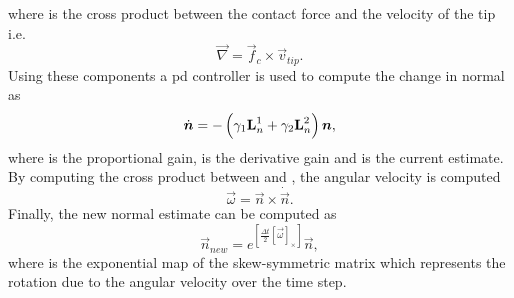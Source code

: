 where  is the cross product between the contact force  and the velocity of the tip  i.e.
%
\begin{equation} \label{eq:def-nabla-rls}
	\vec{\nabla} = \vec{f}_c \times \vec{v}_{tip}.
\end{equation}
Using these components a \gls{pd} controller is used to compute the change in normal  as 
%
\begin{equation} \label{eq:def-n-dot}
	\dot{\bm{n}} = -\left( \gamma_1 \bm{\mathrm{L}}_n^1 + \gamma_2 \bm{\mathrm{L}}_n^2 \right)\bm{n},
\end{equation}
where \mvar{\gamma_1\inR{}} is the proportional gain, \mvar{\gamma_2\inR{}} is the derivative gain and  is the current estimate. By computing the cross product between  and , the angular velocity \mvar{\vec{\omega}} is computed
%
\begin{equation} \label{eq:omega-from-n-and-n-dot}
	\vec{\omega} = \vec{n} \times \dot{\vec{n}}.
\end{equation}
Finally, the new normal estimate  can be computed as
%
\begin{equation}
	\vec{n}_{new} = e^{ \left[ \frac{\Delta t }{2} [\vec{\omega}]_\times \right]} \vec{n},
\end{equation}
where  is the exponential map of the skew-symmetric matrix which represents the rotation due to the angular velocity over the time step.

